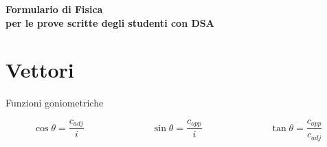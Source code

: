 \documentclass[a4paper,11pt,italian]{article}
\begin{document}
\begin{center}
\textbf{\Large \color{colorSitoScuro}Formulario di Fisica}\\
\textbf{\large \color{colorSitoScuro}per le prove scritte degli studenti con DSA}
\end{center}


\section{Vettori}

\begin{description}
%   
%   
%   
%   
%   
  
  \item[Funzioni goniometriche]   $ \cos\theta = \dfrac{c_{adj}}{i} $~~~~~~~~~~~~~~$ \sin\theta = \dfrac{c_{opp}}{i} $~~~~~~~~~~~~~~$ \tan\theta = \dfrac{c_{opp}}{c_{adj}} $


\end{description}
\end{document}
